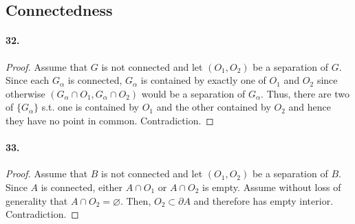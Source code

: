 \subsection{Connectedness}
\paragraph{32.}
\begin{proof}
  Assume that $G$ is not connected and let $(O_1, O_2)$ be a separation of $G$.
  Since each $G_\alpha$ is connected, $G_\alpha$ is contained by exactly
  one of $O_1$ and $O_2$ since otherwise $(G_\alpha\cap O_1, G_\alpha\cap O_2)$
  would be a separation of $G_\alpha$. Thus, there are two of $\{G_\alpha\}$
  s.t. one is contained by $O_1$ and the other contained by $O_2$ and hence 
  they have no point in common. Contradiction.
\end{proof}

\paragraph{33.}
\begin{proof}
  Assume that $B$ is not connected and let $(O_1, O_2)$ be a separation of $B$.
  Since $A$ is connected, either $A\cap O_1$ or $A\cap O_2$ is empty. Assume
  without loss of generality that $A\cap O_2 = \varnothing$. Then, $O_2
  \subset \partial A$ and therefore has empty interior. Contradiction. 
\end{proof}

